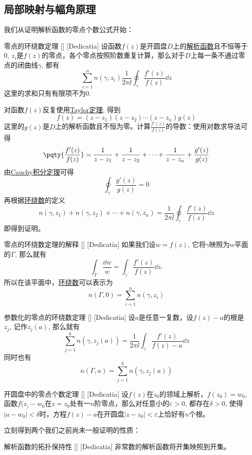 \documentclass[UTF8]{ctexart}
\newcommand{\AnalyticalFunction}{\hyperref[dfn:AnalyticalFunction]{解析函数}}
\newcommand{\TaylorThm}{\hyperref[thm:Taylor]{Taylor定理}}
\newcommand{\CauchyThm}{\hyperref[thm:Cauchy]{Cauchy积分定理}}
\begin{document}
\subsection{局部映射与幅角原理}
我们从证明解析函数的零点个数公式开始：
\begin{thm}
    [UUID]
    {零点的环绕数定理}
    []
    [Dedicatia]
    设函数$f(z)$是开圆盘$D$上的\AnalyticalFunction 且不恒等于0, $z_i$是$f(z)$的零点，各个零点按照阶数重复计算，那么对于$D$上每一条不通过零点的闭曲线$\gamma$, 都有
    \[\sum_{i=1}^n n(\gamma, z_i)\frac{1}{2\pi\ii}\oint_\gamma\frac{f'(z)}{f(z)}\dd{z} \] 
    这里的求和只有有限项不为0.
\end{thm}
\begin{prf}
    对函数$f(z)$反复使用\TaylorThm , 得到
    \[f(z)=(z-z_1)(z-z_2)\cdots(z-z_n)g(z)\]
    这里的$g(z)$是$D$上的解析函数且不恒为零。计算$\frac{f'(z)}{f(z)}$的导数：使用对数求导法可得
    \[\pqty{\frac{f'(z)}{f(z)}}=\frac{1}{z-z_1}+\frac{1}{z-z_2}+\cdots+\frac{1}{z-z_n}+\frac{g'(z)}{g(z)}\]
    由\CauchyThm 可得
    \[\oint_\gamma\frac{g'(z)}{g(z)}=0 \]
    再根据\hyperref[dfn:WindingNumber]{环绕数}的定义
    \[n(\gamma,z_1)+n(\gamma,z_2)+\cdots+n(\gamma,z_n)=\frac{1}{2\pi\ii}\oint_\gamma \frac{f'(z)}{f(z)}\dd{z}\]
    即得到证明。
\end{prf}
\begin{crl}
    [UUID]
    {零点的环绕数定理的解释}
    []
    [Dedicatia]
    如果我们设$w=f(z)$, 它将$\gamma$映照为$w$平面的$\Gamma$, 那么就有
    \[\int_\Gamma\frac{\dd w}{w}=\int_\gamma \frac{f'(z)}{f(z)}\dd{z}.\]
    所以在该平面中，\hyperref[dfn:WindingNumber]{环绕数}可以表示为
    \[n(\Gamma,0)=\sum_{i=1}^n n(\gamma,z_i)\]
\end{crl}
\begin{crl}
    [UUID]
    {参数化的零点的环绕数定理}
    []
    [Dedicatia]
    设$a$是任意一复数，设$f(z)-a$的根是$z_j$, 记作$z_j(a)$, 那么就有
    \[\sum_{j=1}^{k}n(\gamma,z_j(a))=\frac{1}{2\pi\ii}\int_\gamma\frac{f'(z)}{f(z)-a}\dd{z}\]
    同时也有
    \[n(\Gamma,a)=\sum_{j=1}^k n(\gamma,z_j(a))\]
\end{crl}
\begin{thm}
    [UUID]
    {开圆盘中的零点个数定理}
    []
    [Dedicatia]
    设$f(z)$在$z_0$的领域上解析，$f(z_0)=w_0$, 函数$f(z_)-w_0$在$z=z_0$处有一$n$阶零点，那么对任意小的$\varepsilon>0$, 都存在$\delta>0$, 使得$|a-w_0|<\delta$时，方程$f(z)-a$在开圆盘$|z-z_0|<\varepsilon$上恰好有$n$个根。
\end{thm}
立刻得到两个我们之前尚未一般证明的性质：
\begin{crl}
    [UUID]
    {解析函数的拓扑保持性}
    []
    [Dedicatia]
    非常数的解析函数将开集映照到开集。
\end{crl}
\end{document}

